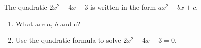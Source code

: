 The quadratic $2x^2-4x-3$ is written in the form $ax^2+bx+c$.
\begin{enumerate}
\item[(a)] What are $a$, $b$ and $c$?
\item[(b)] Use the quadratic formula to solve $2x^2-4x-3=0$.
\end{enumerate}
